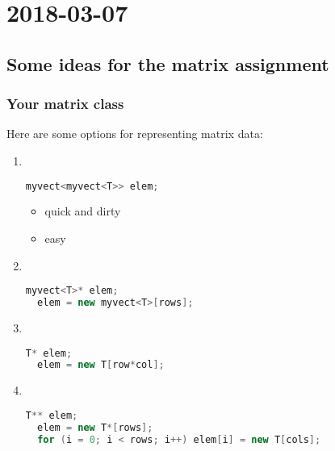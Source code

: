 \section{2018-03-07}

\subsection{Some ideas for the matrix assignment}

\subsubsection{Your matrix class}

Here are some options for representing matrix data:

\begin{enumerate}
  \item \ 
\begin{lstlisting}[language=C++]
  myvect<myvect<T>> elem;
\end{lstlisting}

    \begin{itemize}
      \item quick and dirty
      \item easy
    \end{itemize}

  \item \ 
\begin{lstlisting}[language=C++]
  myvect<T>* elem;
  elem = new myvect<T>[rows];
\end{lstlisting}

  \item \ 
\begin{lstlisting}[language=C++]
  T* elem;
  elem = new T[row*col];
\end{lstlisting}

  \item \ 
\begin{lstlisting}[language=C++]
  T** elem;
  elem = new T*[rows];
  for (i = 0; i < rows; i++) elem[i] = new T[cols];
\end{lstlisting}
\end{enumerate}